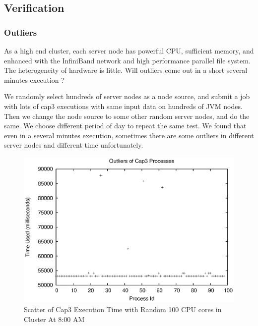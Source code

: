 \subsection{Verification}

\subsubsection{Outliers}
As a high end cluster, each server node has powerful CPU, sufficient memory, and enhanced with the InfiniBand network and high performance parallel file system. The heterogeneity of hardware is little. Will outliers come out in a short several minutes execution ?

We randomly select hundreds of server nodes as a node source, and submit a job with lots of cap3 executions with same input data on hundreds of JVM nodes. Then we change the node source to some other random server nodes, and do the same. We choose different period of day to repeat the same test. We found that even in a several minutes execution, sometimes there are some outliers in different server nodes and different time unfortunately.

\begin{figure}
\centering
\includegraphics[width=0.9\columnwidth]{figures/outliers.eps}
\caption{Scatter of Cap3 Execution Time with Random 100 CPU cores in Cluster At 8:00 AM}
\label{figure:outlier}
\end{figure}

